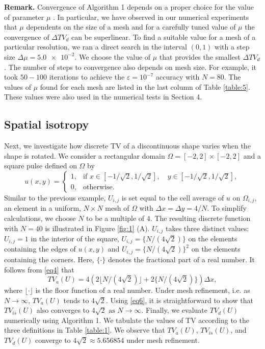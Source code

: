 \documentclass[reqno,a4paper,12pt]{amsart}
\begin{document}
\textbf{Remark.} Convergence of Algorithm 1 depends on a  proper choice for the value of  parameter $\mu$ \cite{Condat}. In particular, we have observed in our numerical experiments that $\mu$ dependents on the size of a mesh and for a carefully tuned value of $\mu$ the convergence of $\Delta TV_d$ can be superlinear. To find a suitable value for a mesh of a particular resolution, we ran a direct search in the interval $(0,1)$ with a step size $\Delta \mu = \num{5.0e-2}$. We choose the value of $\mu$ that provides the smallest $\Delta TV_d$. The number of steps to convergence also depends on mesh size. For example, it took $50-100$ iterations to achieve the $\varepsilon = 10^{-7}$ accuracy with $N = 80$. The values of $\mu$ found for each mesh are listed in the last column of Table \ref{table:5}. These values were also used in the numerical tests in Section 4.

\subsection{Spatial isotropy}

Next, we investigate how discrete TV of a discontinuous shape varies when the shape is rotated. We consider a rectangular domain $\Omega = [-2,2] \times [-2,2]$ and a square pulse defined on $\Omega$ by
\begin{equation}
    u(x,y) = \begin{cases} 1, & \mbox{if } x \in [-1/ \sqrt{2},1/ \sqrt{2}], \quad y \in [-1/ \sqrt{2},1/ \sqrt{2}], \\ 0, & \mbox{otherwise. } \end{cases}
    \label{21}
\end{equation}
Similar to the previous example, $U_{i,j}$ is set equal to the cell average of $u$ on $\Omega_{i,j}$, an element in a uniform, $N \times N$ mesh of $\Omega$ with $\Delta x = \Delta y = 4/N$. To simplify calculations, we choose $N$ to be a multiple of $4$. The resulting discrete function with $N = 40$ is illustrated in Figure \ref{fig:1} (A).  $U_{i,j}$ takes three distinct values: $U_{i,j} = 1$ in the interior of the square, $U_{i,j} = \{N/(4\sqrt{2})\}$ on the elements containing the edges of $u(x,y)$ and $U_{i,j} = \{N/(4\sqrt{2})\}^2$ on the elements containing the corners. Here, $\{ \cdot \}$ denotes the fractional part of a real number. It follows from \eqref{eq4} that
\begin{equation*}
    TV_a(U) = 4 (2 \lfloor N/(4\sqrt{2}) \rfloor + 2 \{N/(4\sqrt{2})\}) \Delta x,
\end{equation*}
where $\lfloor \cdot \rfloor$ is the floor function of a real number. Under mesh refinement, i.e. as $N \to \infty$, $ TV_a(U)$ tends to $4 \sqrt{2}$. Using \eqref{eq6}, it is straightforward to show  that $TV_{is}(U)$  also converges to $4 \sqrt{2} \text{ as } N \to \infty $. Finally, we evaluate $TV_d(U)$ numerically using Algorithm 1. We tabulate the values  of TV according to the three definitions in Table \ref{table:1}.  We observe that $TV_a(U)$, $TV_{is}(U)$, and $TV_d(U)$ converge to $4\sqrt{2} \approx 5.656854$ under mesh refinement. 
\end{document}
